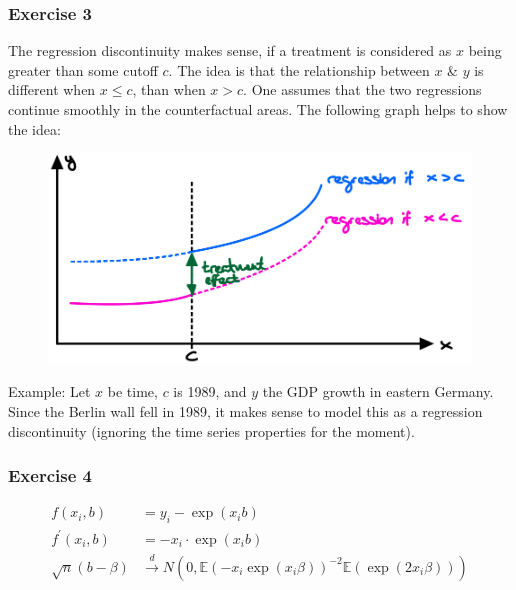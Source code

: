 {{\subsubsection*{Exercise 3}
The regression discontinuity makes sense, if a treatment is considered as $x$ being greater than some cutoff $c$. The idea is that the relationship between $x$ \& $y$ is different when $x \leqslant c$, than when $x>c$. One assumes that the two regressions continue smoothly in the counterfactual areas. The following graph helps to show the idea:

\begin{figure}[!htp]
    \centering
    \includegraphics[width=.75\textwidth]{images/2017_18.png}
\end{figure}

Example: Let $x$ be time, $c$ is 1989, and $y$ the GDP growth in eastern Germany. Since the Berlin wall fell in 1989, it makes sense to model this as a regression discontinuity (ignoring the time series properties for the moment).
}
{
\subsubsection*{Exercise 4}

\begin{enumerate}[label=(\alph*)]
{\item 
$$
\begin{aligned}
f\left(x_{i}, b\right) & =y_{i}-\exp \left(x_{i} b\right) \\
f^{\prime}\left(x_{i}, b\right) & =-x_{i} \cdot \exp \left(x_{i} b\right) \\
\sqrt{n}(b-\beta) & \xrightarrow{d} N\left(0, \mathbb{E}\left(-x_{i} \exp \left(x_{i} \beta\right)\right)^{-2} \mathbb{E}\left(\exp \left(2 x_{i}\beta\right)\right)\right)
\end{aligned}
$$
}
{\item 

}
\end{enumerate}}}
